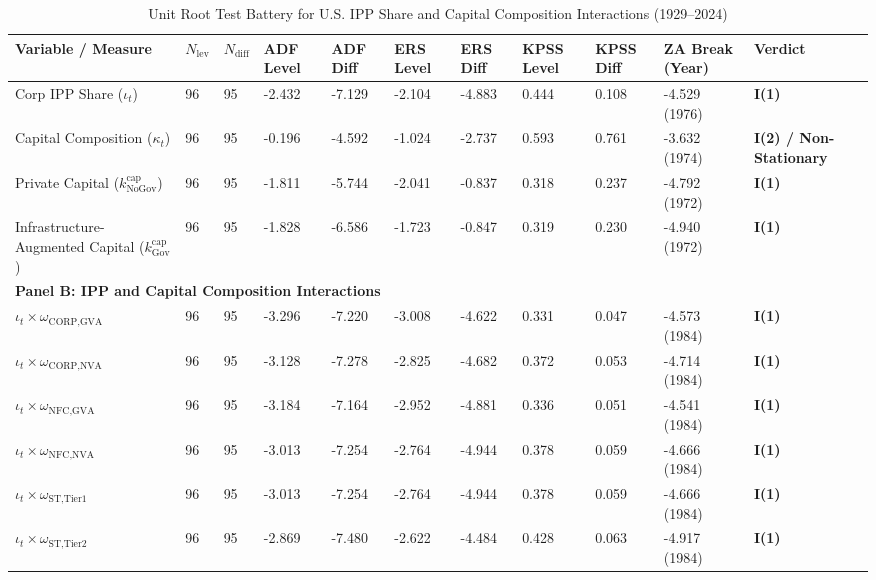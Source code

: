 \documentclass[11pt,a4paper]{article}
\begin{document}
\begin{landscape}
\begin{table}[p]
\centering
\footnotesize
\caption{Unit Root Test Battery for U.S. IPP Share and Capital Composition Interactions (1929--2024)}
\label{tab:urca_results_ipp}
\begin{tabular}{p{6.0cm} p{0.6cm} p{0.6cm} p{1.5cm} p{1.5cm} p{1.5cm} p{1.5cm} p{1.5cm} p{1.5cm} p{2.2cm} p{2.2cm}}
\toprule
\textbf{Variable / Measure} & \textbf{$N_{\text{lev}}$} & \textbf{$N_{\text{diff}}$} & \textbf{ADF Level} & \textbf{ADF Diff} & \textbf{ERS Level} & \textbf{ERS Diff} & \textbf{KPSS Level} & \textbf{KPSS Diff} & \textbf{ZA Break (Year)} & \textbf{Verdict} \\
\midrule
Corp IPP Share ($\iota_t$) & 96 & 95 & -2.432 & -7.129 & -2.104 & -4.883 & 0.444 & 0.108 & -4.529 (1976) & \textbf{I(1)} \\
Capital Composition ($\kappa_t$) & 96 & 95 & -0.196 & -4.592 & -1.024 & -2.737 & 0.593 & 0.761 & -3.632 (1974) & \textbf{I(2) / Non-Stationary} \\
Private Capital ($k^{\text{cap}}_{\text{NoGov}}$) & 96 & 95 & -1.811 & -5.744 & -2.041 & -0.837 & 0.318 & 0.237 & -4.792 (1972) & \textbf{I(1)} \\
Infrastructure-Augmented Capital ($k^{\text{cap}}_{\text{Gov}}$) & 96 & 95 & -1.828 & -6.586 & -1.723 & -0.847 & 0.319 & 0.230 & -4.940 (1972) & \textbf{I(1)} \\
\midrule
\multicolumn{11}{l}{\textbf{Panel B: IPP and Capital Composition Interactions}} \\
\midrule
$\iota_t \times \omega_{\text{CORP,GVA}}$ & 96 & 95 & -3.296 & -7.220 & -3.008 & -4.622 & 0.331 & 0.047 & -4.573 (1984) & \textbf{I(1)} \\
$\iota_t \times \omega_{\text{CORP,NVA}}$ & 96 & 95 & -3.128 & -7.278 & -2.825 & -4.682 & 0.372 & 0.053 & -4.714 (1984) & \textbf{I(1)} \\
$\iota_t \times \omega_{\text{NFC,GVA}}$ & 96 & 95 & -3.184 & -7.164 & -2.952 & -4.881 & 0.336 & 0.051 & -4.541 (1984) & \textbf{I(1)} \\
$\iota_t \times \omega_{\text{NFC,NVA}}$ & 96 & 95 & -3.013 & -7.254 & -2.764 & -4.944 & 0.378 & 0.059 & -4.666 (1984) & \textbf{I(1)} \\
$\iota_t \times \omega_{\text{ST,Tier1}}$ & 96 & 95 & -3.013 & -7.254 & -2.764 & -4.944 & 0.378 & 0.059 & -4.666 (1984) & \textbf{I(1)} \\
$\iota_t \times \omega_{\text{ST,Tier2}}$ & 96 & 95 & -2.869 & -7.480 & -2.622 & -4.484 & 0.428 & 0.063 & -4.917 (1984) & \textbf{I(1)} \\

\end{tabular}
\end{table}
\end{landscape}
\end{document}
